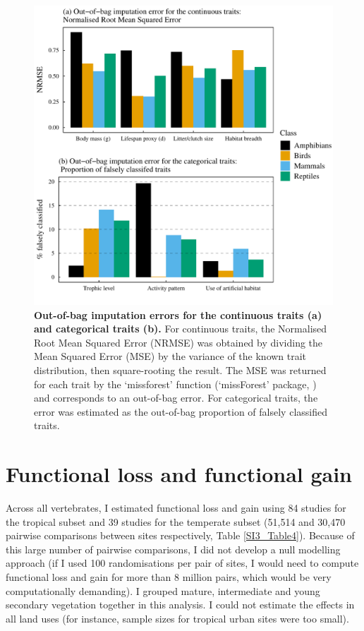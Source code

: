 \begin{figure}[h!]
\centering
\includegraphics[scale=0.8]{Supporting/Chapter3/Figures/SI_imputation_errors}
\caption[Out-of-bag imputation errors for the continuous traits (a) and categorical traits (b)]{\textbf{Out-of-bag imputation errors for the continuous traits (a) and categorical traits (b).} For continuous traits, the Normalised Root Mean Squared Error (NRMSE) was obtained by dividing the Mean Squared Error (MSE) by the variance of the known trait distribution, then square-rooting the result. The MSE was returned for each trait by the `missforest' function (`missForest' package, \cite{Stekhoven2012, Stekhoven2016}) and corresponds to an out-of-bag error. For categorical traits, the error was estimated as the out-of-bag proportion of falsely classified traits.}
\label{SI3_F8}
\end{figure}

\newpage

\section{Functional loss and functional gain}

Across all vertebrates, I estimated functional loss and gain using 84 studies for the tropical subset and 39 studies for the temperate subset (51,514 and 30,470 pairwise comparisons between sites respectively, Table \ref{SI3_Table4}). Because of this large number of pairwise comparisons, I did not develop a null modelling approach (if I used 100 randomisations per pair of sites, I would need to compute functional loss and gain for more than 8 million pairs, which would be very computationally demanding). I grouped mature, intermediate and young secondary vegetation together in this analysis. I could not estimate the effects in all land uses (for instance, sample sizes for tropical urban sites were too small).

